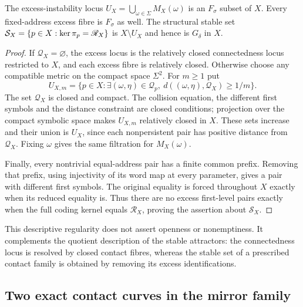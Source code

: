 \begin{proposition}
\label{prop:excess-fsigma}
The excess-instability locus
$U_X=\bigcup_{\omega\in\Sigma}M_X(\omega)$ is an $F_\sigma$ subset of $X$.
Every fixed-address excess fibre is $F_\sigma$ as well. The structural
stable set $\mathcal S_X=\{p\in X:\operatorname{ker}\pi_p=\mathscr R_X\}$ is
$X\setminus U_X$ and hence is $G_\delta$ in $X$.
\end{proposition}
\begin{proof}
If $\mathscr Q_X=\varnothing$, the excess locus is the relatively closed
connectedness locus restricted to $X$, and each excess fibre is relatively
closed. Otherwise choose any compatible metric on the compact space
$\Sigma^2$. For $m\ge1$ put
\[
 U_{X,m}=\{p\in X:\exists(\omega,\eta)\in \mathscr Q_p,
                        \ d((\omega,\eta),\mathscr Q_X)\ge1/m\}.
\]
The set $\mathscr Q_X$ is closed and compact. The collision equation, the different
first symbols and the distance constraint are closed conditions;
projection over the compact symbolic space makes $U_{X,m}$ relatively
closed in $X$. These sets increase and their union is $U_X$, since each
nonpersistent pair has positive distance from $\mathscr Q_X$. Fixing $\omega$
gives the same filtration for $M_X(\omega)$.

Finally, every nontrivial equal-address pair has a finite common prefix.
Removing that prefix, using injectivity of its word map at every parameter,
gives a pair with different first symbols. The original equality is forced
throughout $X$ exactly when its reduced equality is. Thus there are no
excess first-level pairs exactly when the full coding kernel equals
$\mathscr R_X$, proving the assertion about $\mathcal S_X$.
\end{proof}

This descriptive regularity does not assert openness or nonemptiness.
It complements the quotient description of the stable attractors:
the connectedness locus is resolved by closed contact fibres, whereas the
stable set of a prescribed contact family is obtained by removing its
excess identifications.

\subsection{Two exact contact curves in the mirror family}

